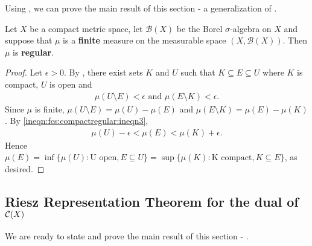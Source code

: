 \begin{definition}
Using , we can prove the main result of this section - a generalization of .

\begin{corollary}
\label{cor:fcs:regularity}
Let $X$ be a compact metric space, let $\mathcal{B}(X)$ be the Borel $\sigma$-algebra on $X$ and suppose that $\mu$ is a \textbf{finite} measure on the measurable space $(X, \mathcal{B}(X))$. Then $\mu$ is \textbf{regular}.
\end{corollary}
\begin{proof}
Let $\epsilon > 0$. By , there exist sets $K$ and $U$ such that $K \subseteq E \subseteq U$ where $K$ is compact, $U$ is open and 
\begin{align}
    \label{ineqn:fcs:compactregular:ineqn3}
    \mu (U \setminus E) < \epsilon \text{ and } \mu (E \setminus K) < \epsilon.
\end{align}
Since $\mu$ is finite, $ \mu (U \setminus E) =  \mu (U) -  \mu(E)$ and $\mu(E \setminus K) = \mu(E) - \mu(K)$.
By \ref{ineqn:fcs:compactregular:ineqn3}, \begin{align*}
    \mu(U) - \epsilon < \mu (E) < \mu(K) + \epsilon.
\end{align*}
Hence $\mu (E) = \inf \{ \mu(U) : \text{U open}, E \subseteq U \}  = \sup \{ \mu(K) : \text{K compact}, K \subseteq E \}$, as desired.
\end{proof}
\end{definition}

\subsection{Riesz Representation Theorem for the dual of ${\mathcal C}(X)$}

We are ready to state and prove the main result of this section - .


